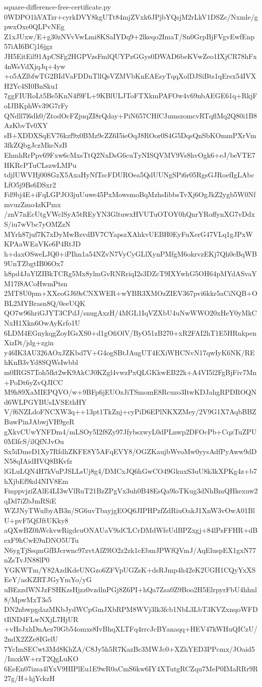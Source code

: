 \documentclass[11pt]{article}
\theoremstyle{definition}
\theoremstyle{remark}
\begin{document}
\begin{filecontents*}[overwrite]{square-difference-free-certificate.py}
0WDPO1hVATzr+cyrkDVY8kgUTt84mjZVxk6JPjbYQsjM2rLkV1DSZc/Nxmle/gpwxOxe0QLPvNEg
Z1xJUxw/E+g30zNVvVwLmi8KSaIYDq9+2lkeqo2ImaT/Sn0GrpBjFVgvEwfEnp57iAI6BCj16jgz
JH5EitEil91ApCSFg2HGPVzsFmlQUYPzGGys0DWAD6beKVwZeo1IXjCR78hFx4nWsVdXjqJq+4yw
+o5AZlbfwTG2BIdVaFDDnTllQsVZMVbKnEAEsyTqqXolDJSiBts1qErsx54IVXH2Yc4SI0BnSku1
7ggFIURoLt5Be5KnN4f9FL+9KBlULJToFTXkmPAFOw4v69nbAEGE61q+RkjFoIJBKphWv39G7rFy
QNdll7l6dk0/ZtodOcFZjuqZI8rQday+PiN657CHfCJumszomcvRTqflMq2Q80i1B8AzKbvTv0XY
sB+XDDXSqEV76kzf9x0BMz9cZZ6I5ieOqJ8ROor0S4G5DqsQnSbKOmmPXrVm3fkZQbgJczMkeNzB
EhmhRrPpv69Fxw6cMxsTtQ2NxDsG6cuTyNISQVMV9Vs8hvOgk6+eJ/beVTE7HKRcPTuCLszwLMPu
tdjlUWVHj008GzX5AxaHyNfTscFDUROea5QdUUNgSPi6r05RgsGJRoefIgLAbcLfO5j9Bs6DSxr2
Fd9bj4E+iFqLGPJO3juUuwe45PxMowsmoBqMzhsIibbsTvXj6OgJkZ2ygb5W0NfmvuzZmo4zKPmx
/znV7nEcUtgVWclSyA5tREyYN3GltuwxHVUTuOTOY0hQnrYRoffynXG7vDdxS/iu7wVbc7yOMZzN
MYrh87juf7K7xDyMwBzvdBV7CYapszXAhkvUEBH0EyFuXerG47VLq1gJPxWKPAaWEaVKe6P4RtJD
h+daxOSweLJQ0+iPIhn1a54NZvN7VyCyGLlXynPMfgM6okrvzEKj7Qh0eBqWB9UnTZbgtIB06Ox7
h8pd4JaYlZIBkTCRg5Mx8ylmGvRNRriqI2s3DZcT9IXYwhG5OH64pMYdASvaYM17f8ACoHwmPtsn
2MT8U0pm+XXeoGJ69sCNXWER+wYBR3XMOzZIEV367pvi6kkr5aCiNQB+OBL2MYBrasn8Q/0eeUQK
QO7w96hriGJYT3CPdJ/snugAxzH/4MGL1IqVZXbU4uNwWWO20xHeY0yMkCNxH1Xkn6OwAyKrfo1U
6LDM4EGnykqgZoyIGsXS0+d1gOfiOlV/ByO51zB270+xR2FAI2hT1E5HRnkpenXizDt/jdg+zgin
y46IK3AU326AOxJZKbd7V+G4ogSBtJAugUT4EXiWHCNvN17qwIyK6NK/REhKnB3vYd8SQWsIwbbl
m0IRGS7Toh5fkt2wK9AkCJ0KZgl4vwzPxQLGKkwEB22k+A4VI5l2FgBjFiv7Mn+PoDt6yZvQJICC
M9h89XaMIEPQVO/w+9BFp6jEUOzJiTSmomE8Rcuzo3ItwKDJahgRPDROQNd6WLPGYBUsLVSEthHY
V/f6NZLdoFNCXW3q++13pt1TkZnj+cyPiD6EPlNKXZMey/2V9G1X7AqbBBZBuwPinJAbwjVH9geR
gXkvCUwYNFDm4/mLSOy5I2f8Zy97JfybsxwyL0dPLnwp2DFOcPb+CqzTuZPU0M3fcS/ilQfNJvOu
Sx5iDmeD1Xy7RfdhZKFE8Y5AFqEVY8/OGZKaujbWvoMw0yysAdfPyAww9dDN58qIAidHVQ8BKvfz
lGLuLQN4H7kVuPJSLLsUj8g4/DMCxJQ6hGwCO49GkuxS3uU8k3kXPKg4z+b7hXjbEf9kd4NIV8Em
FmppvjziZAlE4LI3wVlRuT21BzZPgVx3uh0B48EsQa9loTKug3dNhBmQHkexuw2qDd7iZbJmRSiE
WZJNyTWulbyAB3n/SG6uvTbayjgEOQ6JIPHPzfZdRiuOakJ1XnW3vOwA01BlU+pvF5QfJftUKky8
aQXwBZ0hWckvwRigdcuONAUaV9idCLCrDMdWfeUdBPZxgj+84lPsFFHR+dBexF9hCwE9uDNO5UTu
N6ygTjSsqmGfBJcrwnc97zvtAlZ9lO2z2zk1cEbmJPWfQVmJ/AqEluspEX1gxN77nZsTvJN88lP0
YGKWTm/Y82AzdKdeUNGzo6ZFVpUGZsK+dsRJmp4h42eK2UGH1CQyYxXSEeY/asKZRTJGyYmYo/yG
uBEzzdWNJzFSHKzsHjzz0vzdlnPGj8Z6PI+hQa7Zsa0Z9Boo2H5ElrpyrFbU4hhnl8/MpwMxT3s5
DN2nbwpgdazMKbJydWCpGmJXbRPM8WVj3lk3fcb1NbL3LbT3KVZxnqoWFDtIlND4FLwNXjL7HjUR
+vHsJxhDnAez70Gb54omxs8IvBhqXLTFq4rrcJcBYanaqq+HEV47kWHuQICzU/2ndX2ZZe8IGelU
7YcImSECwt3Md8KhZA/C8Jy5h5R7KazBc3MWJc0+XZhYED3PPcmx/JOaid5/ImxkW+rzT2QgLuKO
6EeEn07izsa4lYxV9HIPlEu1E9wR0aCmS6kw6IY4XTutgRCZqu7MeP0IMaRRr9R27g/H+hjYckzH

\end{filecontents*}
\end{document}
